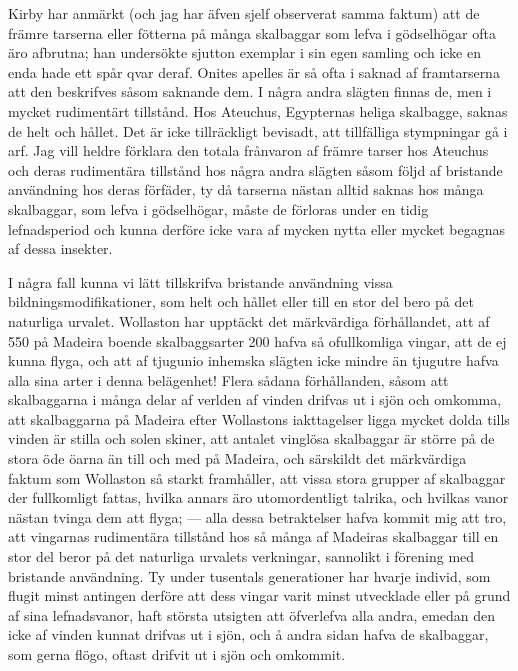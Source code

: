 Kirby har anmärkt (och jag har äfven sjelf observerat samma faktum) att de främre tarserna eller fötterna på många skalbaggar som lefva i gödselhögar ofta äro afbrutna; han undersökte sjutton exemplar i sin egen samling och icke en enda hade ett spår qvar deraf. Onites apelles är så ofta i saknad af framtarserna att den beskrifves såsom saknande dem. I några andra slägten finnas de, men i mycket rudimentärt tillstånd. Hos Ateuchus, Egypternas heliga skalbagge, saknas de helt och hållet. Det är icke tillräckligt bevisadt, att tillfälliga stympningar gå i arf. Jag vill heldre förklara den totala frånvaron af främre tarser hos Ateuchus och deras rudimentära tillstånd hos några andra slägten såsom följd af bristande användning hos deras förfäder, ty då tarserna nästan alltid saknas hos många skalbaggar, som lefva i gödselhögar, måste de förloras under en tidig lefnadsperiod och kunna derföre icke vara af mycken nytta eller mycket begagnas af dessa insekter.

I några fall kunna vi lätt tillskrifva bristande användning vissa bildningsmodifikationer, som helt och hållet eller till en stor del bero på det naturliga urvalet. Wollaston har upptäckt det märkvärdiga förhållandet, att af 550 på Madeira boende skalbaggsarter 200 hafva så ofullkomliga vingar, att de ej kunna flyga, och att af tjugunio inhemska slägten icke mindre än tjugutre hafva alla sina arter i denna belägenhet! Flera sådana förhållanden, såsom att skalbaggarna i många delar af verlden af vinden drifvas ut i sjön och omkomma, att skalbaggarna på Madeira efter Wollastons iakttagelser ligga mycket dolda tills vinden är stilla och solen skiner, att antalet vinglösa skalbaggar är större på de stora öde öarna än till och med på Madeira, och särskildt det märkvärdiga faktum som Wollaston så starkt framhåller, att vissa stora grupper af skalbaggar der fullkomligt fattas, hvilka annars äro utomordentligt talrika, och hvilkas vanor nästan tvinga dem att flyga; — alla dessa betraktelser hafva kommit mig att tro, att vingarnas rudimentära tillstånd hos så många af Madeiras skalbaggar till en stor del beror på det naturliga urvalets verkningar, sannolikt i förening med bristande användning. Ty under tusentals generationer har hvarje individ, som flugit minst antingen derföre att dess vingar varit minst utvecklade eller på grund af sina lefnadsvanor, haft största utsigten att öfverlefva alla andra, emedan den icke af vinden kunnat drifvas ut i sjön, och å andra sidan hafva de skalbaggar, som gerna flögo, oftast drifvit ut i sjön och omkommit.

